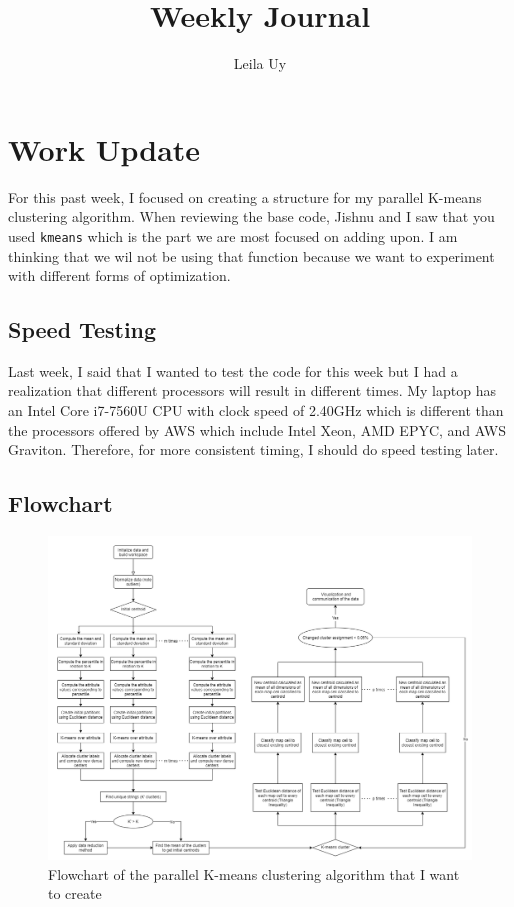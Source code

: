 \documentclass[a4paper,10pt]{article}
\title{Weekly Journal}
\author{Leila Uy}
\begin{document}
\maketitle

% 

\section{Work Update}

For this past week, I focused on creating a structure for my parallel K-means clustering algorithm. 
When reviewing the base code, Jishnu and I saw that you used \verb|kmeans| which is the part we are most 
focused on adding upon. I am thinking that we wil not be using that function because we want to experiment 
with different forms of optimization.

\subsection{Speed Testing}
Last week, I said that I wanted to test the code for this week but I had a realization that different processors 
will result in different times. My laptop has an Intel Core i7-7560U CPU with clock speed of 2.40GHz which is 
different than the processors offered by AWS  which include Intel Xeon, AMD EPYC, and AWS Graviton. Therefore, 
for more consistent timing, I should do speed testing later.

\subsection{Flowchart}
\begin{figure}[h!]
    \caption{Flowchart of the parallel K-means clustering algorithm that I want to create}
    \centering
    \includegraphics[scale=0.34]{flowchart.png}
\end{figure}
\end{document}
